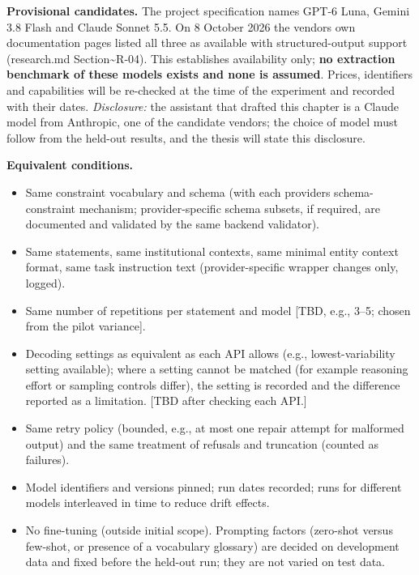 \documentclass[
  11pt,a4paper,oneside]{report}
\providecommand{\tightlist}{%
  \setlength{\itemsep}{0pt}\setlength{\parskip}{0pt}}
\begin{document}
\textbf{Provisional candidates.} The project specification names GPT-6
Luna, Gemini 3.8 Flash and Claude Sonnet 5.5. On 8 October 2026 the
vendors\textquotesingle{} own documentation pages listed all three as
available with structured-output support (research.md
Section\textasciitilde R-04). This establishes availability only;
\textbf{no extraction benchmark of these models exists and none is
assumed}. Prices, identifiers and capabilities will be re-checked at the
time of the experiment and recorded with their dates. \emph{Disclosure:}
the assistant that drafted this chapter is a Claude model from
Anthropic, one of the candidate vendors; the choice of model must follow
from the held-out results, and the thesis will state this disclosure.

\textbf{Equivalent conditions.}

\begin{itemize}
\tightlist
\item
  Same constraint vocabulary and schema (with each
  provider\textquotesingle s schema-constraint mechanism;
  provider-specific schema subsets, if required, are documented and
  validated by the same backend validator).
\item
  Same statements, same institutional contexts, same minimal entity
  context format, same task instruction text (provider-specific wrapper
  changes only, logged).
\item
  Same number of repetitions per statement and model {[}TBD, e.g., 3--5;
  chosen from the pilot variance{]}.
\item
  Decoding settings as equivalent as each API allows (e.g.,
  lowest-variability setting available); where a setting cannot be
  matched (for example reasoning effort or sampling controls differ),
  the setting is recorded and the difference reported as a limitation.
  {[}TBD after checking each API.{]}
\item
  Same retry policy (bounded, e.g., at most one repair attempt for
  malformed output) and the same treatment of refusals and truncation
  (counted as failures).
\item
  Model identifiers and versions pinned; run dates recorded; runs for
  different models interleaved in time to reduce drift effects.
\item
  No fine-tuning (outside initial scope). Prompting factors (zero-shot
  versus few-shot, or presence of a vocabulary glossary) are decided on
  development data and fixed before the held-out run; they are not
  varied on test data.
\end{itemize}
\end{document}
